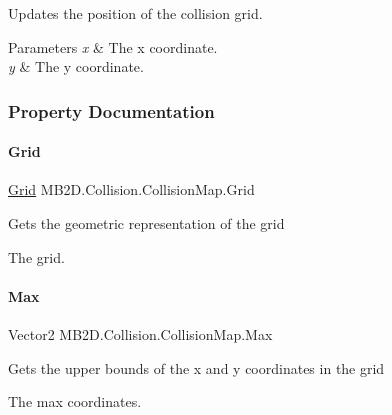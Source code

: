 Updates the position of the collision grid. 


\begin{DoxyParams}{Parameters}
{\em x} & The x coordinate.\\
\hline
{\em y} & The y coordinate.\\
\hline
\end{DoxyParams}


\subsubsection{Property Documentation}
\hypertarget{class_m_b2_d_1_1_collision_1_1_collision_map_aacfa35801f16fad4ea0d128edf522095}{}\label{class_m_b2_d_1_1_collision_1_1_collision_map_aacfa35801f16fad4ea0d128edf522095} 
\paragraph{\texorpdfstring{Grid}{Grid}}
{\footnotesize\ttfamily \hyperlink{class_m_b2_d_1_1_geometry_1_1_grid}{Grid} M\+B2\+D.\+Collision.\+Collision\+Map.\+Grid\hspace{0.3cm}{\ttfamily [get]}}



Gets the geometric representation of the grid 

The grid.\hypertarget{class_m_b2_d_1_1_collision_1_1_collision_map_a707dab6ca65cfe316c248976a0d750f6}{}\label{class_m_b2_d_1_1_collision_1_1_collision_map_a707dab6ca65cfe316c248976a0d750f6} 
\paragraph{\texorpdfstring{Max}{Max}}
{\footnotesize\ttfamily Vector2 M\+B2\+D.\+Collision.\+Collision\+Map.\+Max\hspace{0.3cm}{\ttfamily [get]}}



Gets the upper bounds of the x and y coordinates in the grid 

The max coordinates.\hypertarget{class_m_b2_d_1_1_collision_1_1_collision_map_a0d069be50f64db9f09d488dc2642ee48}{}\label{class_m_b2_d_1_1_collision_1_1_collision_map_a0d069be50f64db9f09d488dc2642ee48} 
